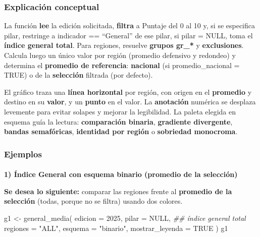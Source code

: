 \documentclass[
  11pt,
  letterpaper,
  DIV=11,
  numbers=noendperiod]{scrartcl}
\makeatletter
\let\oldparagraph\paragraph
\renewcommand{\paragraph}{
    \@ifstar
      \xxxParagraphStar
      \xxxParagraphNoStar
  }
\newcommand{\xxxParagraphStar}[1]{\oldparagraph*{#1}\mbox{}}
\newcommand{\xxxParagraphNoStar}[1]{\oldparagraph{#1}\mbox{}}
\newenvironment{Shaded}{\begin{snugshade}}{\end{snugshade}}
\newcommand{\AttributeTok}[1]{\textcolor[rgb]{0.40,0.45,0.13}{#1}}
\newcommand{\ConstantTok}[1]{\textcolor[rgb]{0.56,0.35,0.01}{#1}}
\newcommand{\DecValTok}[1]{\textcolor[rgb]{0.68,0.00,0.00}{#1}}
\newcommand{\DocumentationTok}[1]{\textcolor[rgb]{0.37,0.37,0.37}{\textit{#1}}}
\newcommand{\FunctionTok}[1]{\textcolor[rgb]{0.28,0.35,0.67}{#1}}
\newcommand{\NormalTok}[1]{\textcolor[rgb]{0.00,0.23,0.31}{#1}}
\newcommand{\OtherTok}[1]{\textcolor[rgb]{0.00,0.23,0.31}{#1}}
\newcommand{\StringTok}[1]{\textcolor[rgb]{0.13,0.47,0.30}{#1}}
\makeatother
\begin{document}
\subsubsection{\texorpdfstring{\textbf{Explicación
conceptual}}{Explicación conceptual}}\label{explicaciuxf3n-conceptual-7}

La función \textbf{lee} la edición solicitada, \textbf{filtra} a Puntaje
del 0 al 10 y, si se especifica pilar, restringe a indicador ==
``General'' de ese pilar, si pilar = NULL, toma el \textbf{índice
general total}. Para regiones, resuelve \textbf{grupos gr\_*} y
\textbf{exclusiones}. Calcula luego un único valor por región (promedio
defensivo y redondeo) y determina el \textbf{promedio de referencia}:
\textbf{nacional} (si promedio\_nacional = TRUE) o de la
\textbf{selección} filtrada (por defecto).

El gráfico traza una \textbf{línea horizontal} por región, con origen en
el \textbf{promedio} y destino en su \textbf{valor}, y un \textbf{punto}
en el valor. La \textbf{anotación} numérica se desplaza levemente para
evitar solapes y mejorar la legibilidad. La paleta elegida en esquema
guía la lectura: \textbf{comparación binaria}, \textbf{gradiente
divergente}, \textbf{bandas semafóricas}, \textbf{identidad por región}
o \textbf{sobriedad monocroma}.

\subsubsection{\texorpdfstring{\textbf{Ejemplos}}{Ejemplos}}\label{ejemplos-7}

\paragraph{\texorpdfstring{\textbf{1) Índice General con esquema binario
(promedio de la
selección)}}{1) Índice General con esquema binario (promedio de la selección)}}\label{uxedndice-general-con-esquema-binario-promedio-de-la-selecciuxf3n}

\textbf{Se desea lo siguiente:} comparar las regiones frente al
\textbf{promedio de la selección} (todas, porque no se filtra) usando
dos colores.

\begin{Shaded}
\begin{Highlighting}[]
\NormalTok{g1 }\OtherTok{\textless{}{-}} \FunctionTok{general\_media}\NormalTok{(}
  \AttributeTok{edicion =} \DecValTok{2025}\NormalTok{,}
  \AttributeTok{pilar   =} \ConstantTok{NULL}\NormalTok{,          }\DocumentationTok{\#\# índice general total}
  \AttributeTok{regiones =} \StringTok{"ALL"}\NormalTok{,}
  \AttributeTok{esquema =} \StringTok{"binario"}\NormalTok{,}
  \AttributeTok{mostrar\_leyenda =} \ConstantTok{TRUE}
\NormalTok{)}
\NormalTok{g1}
\end{Highlighting}
\end{Shaded}
\end{document}
